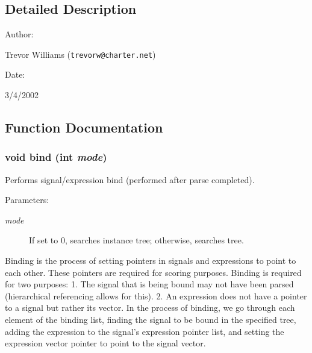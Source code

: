\subsection{Detailed Description}


\begin{Desc}
\item[Author: ]\par
Trevor Williams ({\tt trevorw@charter.net}) \end{Desc}
\begin{Desc}
\item[Date: ]\par
3/4/2002\end{Desc}


\subsection{Function Documentation}
\subsubsection{\setlength{\rightskip}{0pt plus 5cm}void bind (int {\em mode})}\label{binding_8c_a6}


Performs signal/expression bind (performed after parse completed).

\begin{Desc}
\item[Parameters: ]\par
\begin{description}
\item[{\em 
mode}]If set to 0, searches instance tree; otherwise, searches tree.\end{description}
\end{Desc}
Binding is the process of setting pointers in signals and expressions to point to each other. These pointers are required for scoring purposes. Binding is required for two purposes: 1. The signal that is being bound may not have been parsed (hierarchical referencing allows for this). 2. An expression does not have a pointer to a signal but rather its vector. In the process of binding, we go through each element of the binding list, finding the signal to be bound in the specified tree, adding the expression to the signal's expression pointer list, and setting the expression vector pointer to point to the signal vector. 
